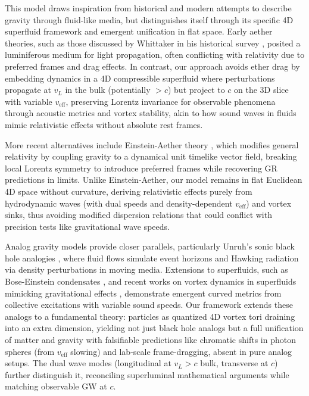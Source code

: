 \documentclass{article}
\begin{document}
This model draws inspiration from historical and modern attempts to describe gravity through fluid-like media, but distinguishes itself through its specific 4D superfluid framework and emergent unification in flat space. Early aether theories, such as those discussed by Whittaker in his historical survey \cite{whittaker1951history}, posited a luminiferous medium for light propagation, often conflicting with relativity due to preferred frames and drag effects. In contrast, our approach avoids ether drag by embedding dynamics in a 4D compressible superfluid where perturbations propagate at $v_L$ in the bulk (potentially $>c$) but project to $c$ on the 3D slice with variable $v_{\text{eff}}$, preserving Lorentz invariance for observable phenomena through acoustic metrics and vortex stability, akin to how sound waves in fluids mimic relativistic effects without absolute rest frames.

More recent alternatives include Einstein-Aether theory \cite{jacobson2004einstein}, which modifies general relativity by coupling gravity to a dynamical unit timelike vector field, breaking local Lorentz symmetry to introduce preferred frames while recovering GR predictions in limits. Unlike Einstein-Aether, our model remains in flat Euclidean 4D space without curvature, deriving relativistic effects purely from hydrodynamic waves (with dual speeds and density-dependent $v_{\text{eff}}$) and vortex sinks, thus avoiding modified dispersion relations that could conflict with precision tests like gravitational wave speeds.

Analog gravity models provide closer parallels, particularly Unruh's sonic black hole analogies \cite{unruh1995sonic}, where fluid flows simulate event horizons and Hawking radiation via density perturbations in moving media. Extensions to superfluids, such as Bose-Einstein condensates \cite{garay2000sonic}, and recent works on vortex dynamics in superfluids mimicking gravitational effects \cite{simula2020gravitational, svancara2024rotating}, demonstrate emergent curved metrics from collective excitations with variable sound speeds. Our framework extends these analogs to a fundamental theory: particles as quantized 4D vortex tori draining into an extra dimension, yielding not just black hole analogs but a full unification of matter and gravity with falsifiable predictions like chromatic shifts in photon spheres (from $v_{\text{eff}}$ slowing) and lab-scale frame-dragging, absent in pure analog setups. The dual wave modes (longitudinal at $v_L > c$ bulk, transverse at $c$) further distinguish it, reconciling superluminal mathematical arguments while matching observable GW at $c$.
\end{document}
